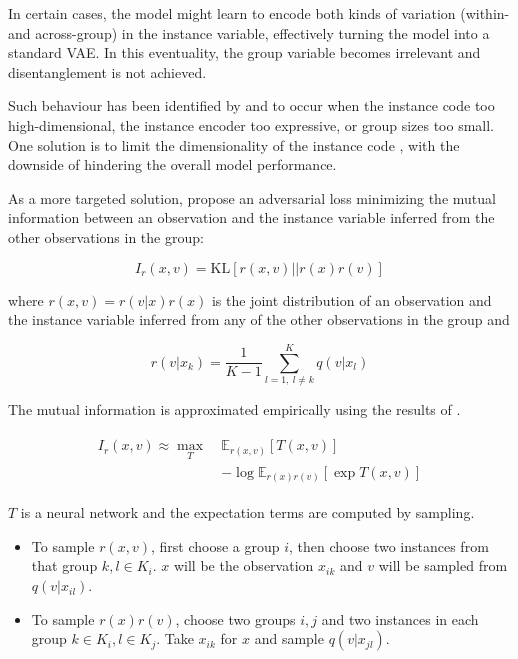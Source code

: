 \documentclass[nohyperref]{article}
\theoremstyle{plain}
\theoremstyle{definition}
\theoremstyle{remark}
\begin{document}
In certain cases, the model might learn to encode both kinds of variation (within- and across-group) in the instance variable, effectively turning the model into a standard VAE. In this eventuality, the group variable becomes irrelevant and disentanglement is not achieved.

Such behaviour has been identified by \citet{Hosoya2019GroupbasedLO} and \citet{Nmeth2020AdversarialDW} to occur when the instance code too high-dimensional, the instance encoder too expressive, or group sizes too small. One solution is to limit the dimensionality of the instance code \citep{Hosoya2019GroupbasedLO}, with the downside of hindering the overall model performance. 

As a more targeted solution, \citet{Hosoya2019GroupbasedLO} propose an adversarial loss minimizing the mutual information between an observation and the instance variable inferred from the other observations in the group:

$$I_{r} (x, v) = \mathrm{KL} [r(x, v) || r(x) r(v)]$$

where $r(x, v) = r(v | x) r(x)$ is the joint distribution of an observation and the instance variable inferred from any of the other observations in the group and 

$$r(v | x_k) = \frac{1}{K - 1} \sum_{l=1, ~ l \neq k}^K q(v | x_l)$$

The mutual information is approximated empirically using the results of \citet{Belghazi2018MutualIN}.

\begin{align}
\begin{split}
I_{r} (x, v) \approx \max_{T} ~ &\mathbb{E}_{r(x, v)} [T(x, v)] \\ &- \log \mathbb{E}_{r(x)r(v)} [\exp T(x, v)] 
\end{split}
\end{align}

$T$ is a neural network and the expectation terms are computed by sampling.

\begin{itemize}
    \item To sample $r(x, v)$, first choose a group $i$, then choose two instances from that group $k, l \in K_i$. $x$ will be the observation $x_{ik}$ and $v$ will be sampled from $q(v | x_{il})$.
    \item To sample $r(x)r(v)$, choose two groups $i, j$ and two instances in each group $k \in K_i, l \in K_j$. Take $x_{ik}$ for $x$ and sample $q(v | x_{jl})$.
\end{itemize}
\end{document}
